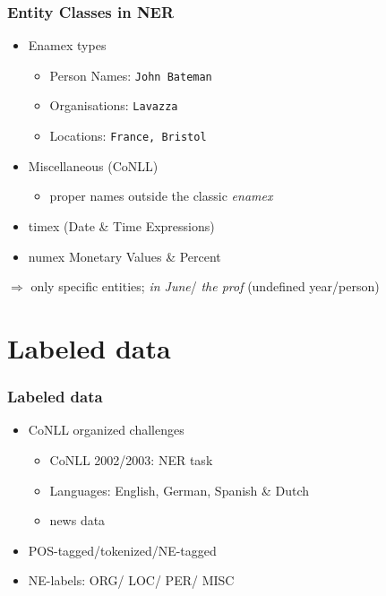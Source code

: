 \documentclass[10pt]{beamer}
\begin{document}


\begin{frame}
\frametitle{Entity Classes in NER}

\begin{itemize}
 \item Enamex types
\begin{itemize}
 \item Person Names: \texttt{John Bateman}
 \item Organisations: \texttt{Lavazza}
 \item Locations: \texttt{France, Bristol}
\end{itemize}

 \item Miscellaneous (CoNLL)
 \begin{itemize}
  \item  proper names outside the classic \emph{enamex}
 \end{itemize}

 \item timex (Date \& Time Expressions)
 
\item numex Monetary Values \& Percent
\end{itemize}        

$\Rightarrow$ only specific entities; \emph{in June}/ \emph{the prof} (undefined year/person) %
 \end{frame}


\section{Labeled data}
\begin{frame}
\frametitle{Labeled data}


\begin{itemize}
        \item CoNLL organized challenges
        \begin{itemize}
         \item CoNLL 2002/2003:  NER task
         \item Languages: English, German, Spanish \& Dutch
         \item news data 
        \end{itemize}
        \item POS-tagged/tokenized/NE-tagged
    \item NE-labels: ORG/ LOC/ PER/ MISC 
\end{itemize}
\end{frame}
\end{document}

